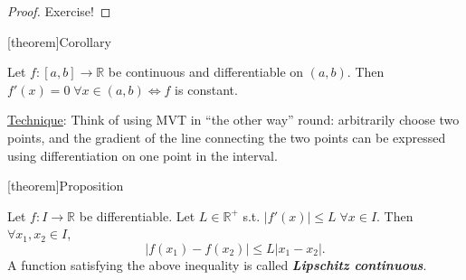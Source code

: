 \documentclass[12pt]{report}
\theoremstyle{definition}
\begin{document}
\begin{proof}
    Exercise!
\end{proof}

[theorem]{Corollary}
\begin{f is constant then gradient is 0}
    Let $f:[a,b]\rightarrow{}\mathbb{R}$ be continuous and differentiable on $(a,b)$.
    Then $f'(x) = 0 \;\forall x \in (a,b) \iff f$ is constant.
\end{f is constant then gradient is 0}

\underline{Technique}: Think of using MVT in ``the other way'' round: arbitrarily choose two points,
and the gradient of the line connecting the two points can be expressed using
differentiation on one point in the interval.

[theorem]{Proposition}
\begin{Lipschitz continuous}
    Let $f:I\rightarrow{}\mathbb{R}$ be differentiable.
    Let $L\in \mathbb{R}^{+}$ s.t. $|f'(x)|\le L \;\forall x \in I$.
    Then $\forall x_1, x_2\in I$,\[
        |f(x_1) - f(x_2)| \le L|x_1 - x_2|.
    \]
    A function satisfying the above inequality is called \textbf{\emph{Lipschitz continuous}}.
\end{Lipschitz continuous}








\end{document}
